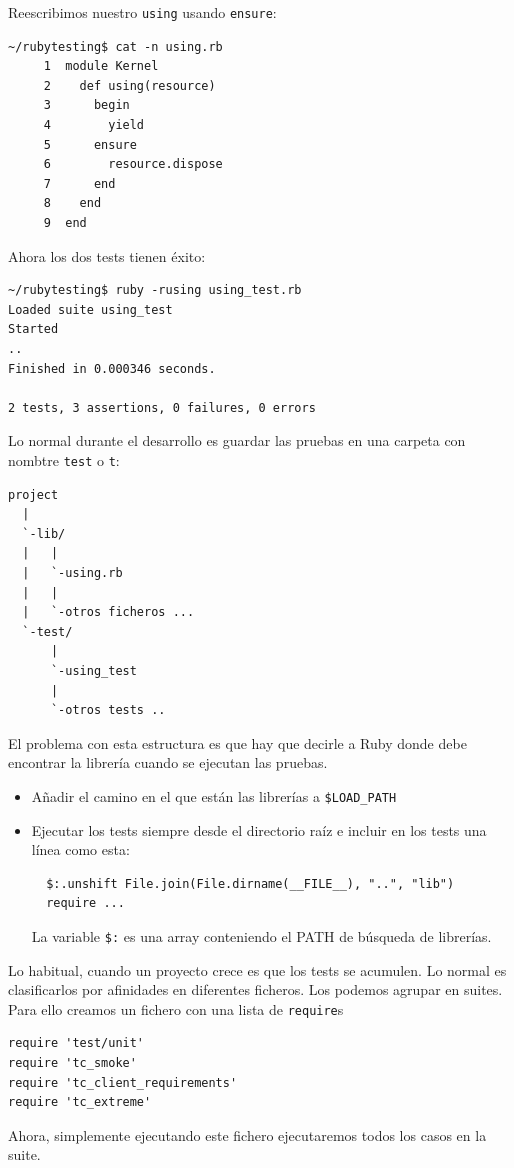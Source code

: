 Reescribimos nuestro \verb|using| usando \verb|ensure|:
\begin{verbatim}
~/rubytesting$ cat -n using.rb 
     1  module Kernel
     2    def using(resource)
     3      begin
     4        yield
     5      ensure
     6        resource.dispose
     7      end
     8    end
     9  end
\end{verbatim}
Ahora los dos tests tienen éxito:
\begin{verbatim}
~/rubytesting$ ruby -rusing using_test.rb 
Loaded suite using_test
Started
..
Finished in 0.000346 seconds.

2 tests, 3 assertions, 0 failures, 0 errors
\end{verbatim}

Lo normal durante el desarrollo es guardar las pruebas en una carpeta con nombtre \verb|test| o \verb|t|:

\begin{verbatim}
project
  |
  `-lib/
  |   |
  |   `-using.rb
  |   |
  |   `-otros ficheros ...
  `-test/ 
      |
      `-using_test
      |
      `-otros tests ..
\end{verbatim}
El problema con esta estructura es que hay que decirle a Ruby donde debe encontrar la librería
cuando se ejecutan las pruebas.
\begin{itemize}
\item Añadir el camino en el que están las librerías a \verb|$LOAD_PATH|
\item Ejecutar los tests siempre desde el directorio raíz e incluir en los tests una línea como esta:

\begin{verbatim}
  $:.unshift File.join(File.dirname(__FILE__), "..", "lib") 
  require ...
\end{verbatim}
La variable \verb|$:| es una array conteniendo el PATH de búsqueda de librerías.
\end{itemize}

Lo habitual, cuando un proyecto crece
es que los tests se acumulen. Lo normal es clasificarlos 
por afinidades en diferentes ficheros. 
Los podemos agrupar en suites. Para ello creamos 
un fichero con una lista de \verb|require|s

\begin{verbatim}
require 'test/unit' 
require 'tc_smoke' 
require 'tc_client_requirements' 
require 'tc_extreme' 
\end{verbatim}

Ahora, simplemente ejecutando este fichero ejecutaremos todos los casos en la suite.



